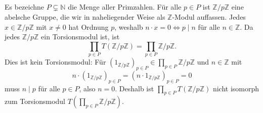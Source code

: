 \documentclass[a4paper,10pt]{article}
\theoremstyle{definition}
\newcommand{\N}{\mathbb{N}}
\newcommand{\Z}{\mathbb{Z}}
\begin{document}
\subsection{}
Es bezeichne $P \subsetneq \N$ die Menge aller Primzahlen. Für alle $p \in P$ ist $\Z/p\Z$ eine abelsche Gruppe, die wir in naheliegender Weise als $\Z$-Modul auffassen. Jedes $x \in \Z/p\Z$ mit $x \neq 0$ hat Ordnung $p$, weshalb $n \cdot x = 0 \Leftrightarrow p \mid n$ für alle $n \in \Z$. Da jedes $\Z/p\Z$ ein Torsionsmodul ist, ist
\[
 \prod_{p \in P} T(\Z/p\Z) = \prod_{p \in P} \Z/p\Z.
\]
Dies ist kein Torsionsmodul: Für $(1_{\Z/p\Z})_{p \in P} \in \prod_{p \in P} \Z/p\Z$ und $n \in \Z$ mit
\[
 n \cdot (1_{\Z/p\Z})_{p \in P} = (n \cdot 1_{\Z/p\Z})_{p \in P} = 0
\]
muss $n \mid p$ für alle $p \in P$, also $n = 0$. Deshalb ist $\prod_{p \in P} T(\Z/p\Z)$ nicht isomorph zum Torsionsmodul $T(\prod_{p \in P} \Z/p\Z)$.
\end{document}
